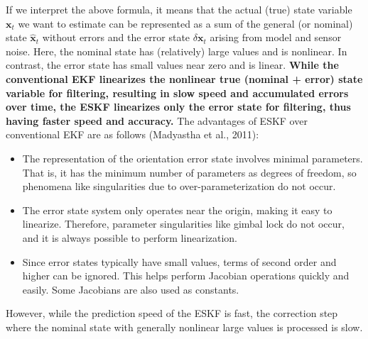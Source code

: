 \documentclass[10pt]{article}
\begin{document}
	If we interpret the above formula, it means that the actual (true) state variable $\mathbf{x}_{t}$ we want to estimate can be represented as a sum of the general (or nominal) state $\hat{\mathbf{x}}_{t}$ without errors and the error state $\delta \mathbf{x}_{t}$ arising from model and sensor noise. Here, the nominal state has (relatively) large values and is nonlinear. In contrast, the error state has small values near zero and is linear. \textbf{While the conventional EKF linearizes the nonlinear true (nominal + error) state variable for filtering, resulting in slow speed and accumulated errors over time, the ESKF linearizes only the error state for filtering, thus having faster speed and accuracy.} The advantages of ESKF over conventional EKF are as follows (Madyastha et al., 2011):
	\begin{itemize}
		\item The representation of the orientation error state involves minimal parameters. That is, it has the minimum number of parameters as degrees of freedom, so phenomena like singularities due to over-parameterization do not occur.
		\item The error state system only operates near the origin, making it easy to linearize. Therefore, parameter singularities like gimbal lock do not occur, and it is always possible to perform linearization.
		
		\item Since error states typically have small values, terms of second order and higher can be ignored. This helps perform Jacobian operations quickly and easily. Some Jacobians are also used as constants.
	\end{itemize}
	
	However, while the prediction speed of the ESKF is fast, the correction step where the nominal state with generally nonlinear large values is processed is slow.
	~\\~\\
	
\end{document}
